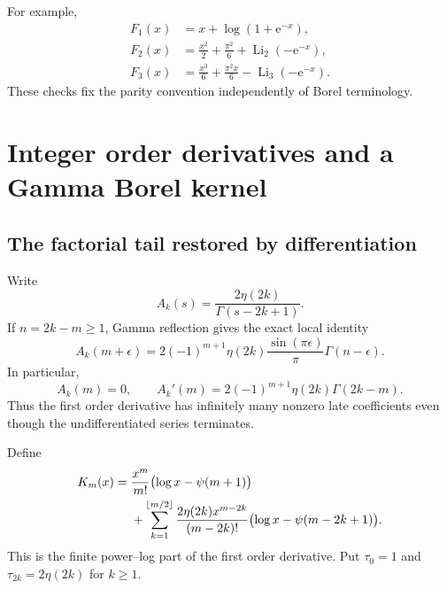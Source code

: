 \documentclass[11pt,a4paper]{article}
\theoremstyle{definition}\newtheorem{definition}[theorem]{Definition}
\theoremstyle{remark}\newtheorem{remark}[theorem]{Remark}
\newcommand{\Li}{\operatorname{Li}}
\newcommand{\ee}{\mathrm e}
\numberwithin{equation}{section}
\begin{document}
For example,
\begin{align*}
 F_1(x)&=x+\log(1+\ee^{-x}),\\
 F_2(x)&=\frac{x^2}{2}+\frac{\pi^2}{6}+\Li_2(-\ee^{-x}),\\
 F_3(x)&=\frac{x^3}{6}+\frac{\pi^2x}{6}-\Li_3(-\ee^{-x}).
\end{align*}
These checks fix the parity convention independently of Borel terminology.

\section{Integer order derivatives and a Gamma Borel kernel}\label{sec:jets}

\subsection{The factorial tail restored by differentiation}

Write
\begin{equation}\label{eq:ak}
 A_k(s)=\frac{2\eta(2k)}{\Gamma(s-2k+1)}.
\end{equation}
If $n=2k-m\ge1$, Gamma reflection gives the exact local identity
\begin{equation}\label{eq:gamma-detuning}
 A_k(m+\epsilon)=2(-1)^{m+1}\eta(2k)
           \frac{\sin(\pi\epsilon)}\pi\Gamma(n-\epsilon).
\end{equation}
In particular,
\begin{equation}\label{eq:first-late}
 A_k(m)=0,\qquad A_k'(m)=2(-1)^{m+1}\eta(2k)\Gamma(2k-m).
\end{equation}
Thus the first order derivative has infinitely many nonzero late
coefficients even though the undifferentiated series terminates.

Define
\begin{align}\label{eq:Km}
 K_m(x)={}&\frac{x^m}{m!}\bigl(\log x-\psi(m+1)\bigr)\notag\\
 &+\sum_{k=1}^{\lfloor m/2\rfloor}
 \frac{2\eta(2k)x^{m-2k}}{(m-2k)!}
       \bigl(\log x-\psi(m-2k+1)\bigr).
\end{align}
This is the finite power--log part of the first order derivative.
Put $\tau_0=1$ and $\tau_{2k}=2\eta(2k)$ for $k\ge1$.
\end{document}
